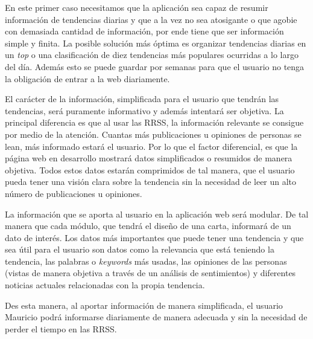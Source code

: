En este primer caso necesitamos que la aplicación sea capaz de resumir información de tendencias diarias y que a la vez no sea atosigante o que agobie con demasiada cantidad de información, por ende tiene que ser información simple y finita. La posible solución más óptima es organizar tendencias diarias en un \textit{top} o una clasificación de diez tendencias más populares ocurridas a lo largo del día. Además esto se puede guardar por semanas para que el usuario no tenga la obligación de entrar a la web diariamente.

\vspace{0.3cm}

El carácter de la información, simplificada para el usuario que tendrán las tendencias, será puramente informativo y además intentará ser objetiva. La principal diferencia es que al usar las \ac{RRSS}, la información relevante se consigue por medio de la atención. Cuantas más publicaciones u opiniones de personas se lean, más informado estará el usuario. Por lo que el factor diferencial, es que la página web en desarrollo mostrará datos simplificados o resumidos de manera objetiva. Todos estos datos estarán comprimidos de tal manera, que el usuario pueda tener una visión clara sobre la tendencia sin la necesidad de leer un alto número de publicaciones u opiniones.

\vspace{0.3cm}

La información que se aporta al usuario en la aplicación web será modular. De tal manera que cada módulo, que tendrá el diseño de una carta, informará de un dato de interés. Los datos más importantes que puede tener una tendencia y que sea útil para el usuario son datos como la relevancia que está teniendo la tendencia, las palabras o \textit{keywords} más usadas, las opiniones de las personas (vistas de manera objetiva a través de un análisis de sentimientos) y diferentes noticias actuales relacionadas con la propia tendencia.

\vspace{0.3cm}

Des esta manera, al aportar información de manera simplificada, el usuario Mauricio podrá informarse diariamente de manera adecuada y sin la necesidad de perder el tiempo en las \ac{RRSS}.


